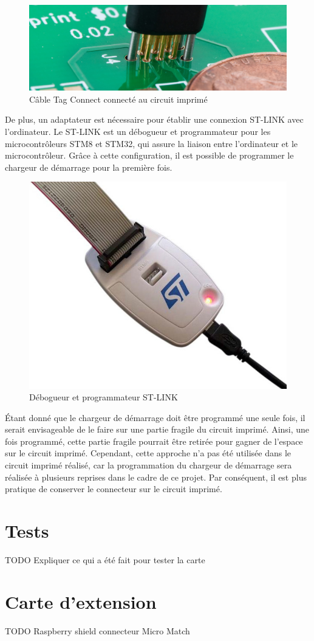 \begin{figure}[H]
    \centering
    \includegraphics[scale=0.2]{./assets/figures/tag_connect_pcb.jpg}
    \caption{\cite{tag_connect_pcb} Câble Tag Connect connecté au circuit imprimé}
\end{figure}

De plus, un adaptateur est nécessaire pour établir une connexion ST-LINK avec l'ordinateur.
Le ST-LINK est un débogueur et programmateur pour les microcontrôleurs STM8 et STM32, qui assure la liaison entre l'ordinateur et le microcontrôleur.
Grâce à cette configuration, il est possible de programmer le chargeur de démarrage pour la première fois.

\begin{figure}[H]
    \centering
    \includegraphics[scale=0.3]{./assets/figures/st_link.jpg}
    \caption{\cite{st_link} Débogueur et programmateur ST-LINK}
\end{figure}

Étant donné que le chargeur de démarrage doit être programmé une seule fois, il serait envisageable de le faire sur une partie fragile du circuit imprimé.
Ainsi, une fois programmé, cette partie fragile pourrait être retirée pour gagner de l'espace sur le circuit imprimé.
Cependant, cette approche n'a pas été utilisée dans le circuit imprimé réalisé, car la programmation du chargeur de démarrage sera réalisée à plusieurs reprises dans le cadre de ce projet.
Par conséquent, il est plus pratique de conserver le connecteur sur le circuit imprimé.

\section{Tests}

TODO Expliquer ce qui a été fait pour tester la carte

\section{Carte d'extension}

TODO Raspberry shield connecteur Micro Match